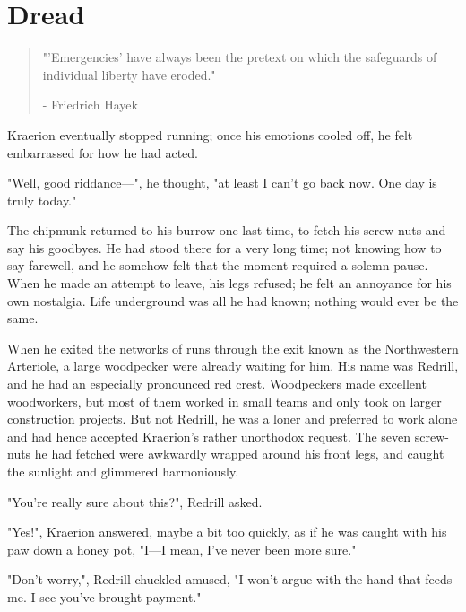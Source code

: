 \chapter{Dread}

\vspace{-1.3cm}
\begin{localsize}{10}
	\begin{quote}
		"'Emergencies' have always been the pretext on which the safeguards of individual liberty have eroded."
		\begin{flushright}- Friedrich Hayek\end{flushright}
	\end{quote} 
\end{localsize}
\vspace{1cm}


Kraerion eventually stopped running; once his emotions cooled off, he felt embarrassed for how he had acted. 

"Well, good riddance---", he thought, "at least I can't go back now. One day is truly today."

The chipmunk returned to his burrow one last time, to fetch his screw nuts and say his goodbyes. He had stood there for a very long time; not knowing how to say farewell, and he somehow felt that the moment required a solemn pause. When he made an attempt to leave, his legs refused; he felt an annoyance for his own nostalgia. Life underground was all he had known; nothing would ever be the same.

When he exited the networks of runs through the exit known as the Northwestern Arteriole, a large woodpecker were already waiting for him. His name was Redrill, and he had an especially pronounced red crest. Woodpeckers made excellent woodworkers, but most of them worked in small teams and only took on larger construction projects. But not Redrill, he was a loner and preferred to work alone and had hence accepted Kraerion's rather unorthodox request. The seven screw-nuts he had fetched were awkwardly wrapped around his front legs, and caught the sunlight and glimmered harmoniously. 

"You're really sure about this?", Redrill asked.

"Yes!", Kraerion answered, maybe a bit too quickly, as if he was caught with his paw down a honey pot, "I---I mean, I've never been more sure."

"Don't worry,", Redrill chuckled amused, "I won't argue with the hand that feeds me. I see you've brought payment."

